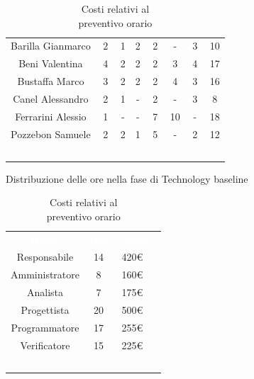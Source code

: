 \begin{table}[h!]
\begin{minipage}[c]{0.53\textwidth}
\begin{tabular}{>{\raggedright\arraybackslash}c|cccccc|c}
		\rowcolor[RGB]{216, 235, 171}
	    	Barilla Gianmarco & 2 & 1 & 2 & 2 & - & 3& 10		\\[4pt]
	    \rowcolor[RGB]{233, 245, 206}
	    	Beni Valentina & 4 & 2 & 2 & 2 & 3 & 4& 17			\\[4pt]
	    \rowcolor[RGB]{216, 235, 171}
	    	Bustaffa Marco & 3 & 2 & 2 & 2 & 4 & 3& 16			\\[4pt]
        \rowcolor[RGB]{233, 245, 206}
	    	Canel Alessandro & 2 & 1 & - & 2 & - & 3& 8			\\[4pt]
        \rowcolor[RGB]{216, 235, 171}
	    	Ferrarini Alessio & 1 & - & - & 7 & 10 & -& 18		\\[4pt]
        \rowcolor[RGB]{233, 245, 206}
	    	Pozzebon Samuele & 2 & 2 & 1 & 5 & - & 2& 12			\\[4pt]
		\rowcolor[RGB]{47, 106, 73}
			\textcolor{white}{Totale Ruolo} & \textcolor{white}{14} & \textcolor{white}{8} & \textcolor{white}{7} 
			& \textcolor{white}{20} & \textcolor{white}{17} & \textcolor{white}{15}
			& \textcolor{white}{81} \\[4pt]	
    \end{tabular}
    \caption{Distribuzione delle ore nella fase di Technology baseline}
\end{minipage}
\hfill
\begin{minipage}{0.33\textwidth}
	\centering
	\begin{tabular}{cccc}
	    \rowcolor[RGB]{33, 73, 50}
	    \textcolor{white}{\textbf{Ruolo}} & \textcolor{white}{\textbf{Ore}} & \textcolor{white}{\textbf{Costo}}\\[4pt]
	    \rowcolor[RGB]{216, 235, 171}
	    Responsabile & 14 & 420\euro\\[4pt]
	    \rowcolor[RGB]{233, 245, 206}
	    Amministratore & 8 & 160\euro\\[4pt]
        \rowcolor[RGB]{216, 235, 171}
	    Analista & 7 & 175\euro\\[4pt]
	    \rowcolor[RGB]{233, 245, 206}
	    Progettista & 20 & 500\euro\\[4pt]
        \rowcolor[RGB]{216, 235, 171}
	    Programmatore & 17 & 255\euro\\[4pt]
	    \rowcolor[RGB]{233, 245, 206}
	    Verificatore & 15 & 225\euro\\[4pt]
		\rowcolor[RGB]{47, 106, 73}
			\textcolor{white}{Totale} & \textcolor{white}{81} & \textcolor{white}{1735\euro}\\[4pt]	
    \end{tabular}	
	\caption{Costi relativi al \\ preventivo orario}

\end{minipage}
\end{table}

